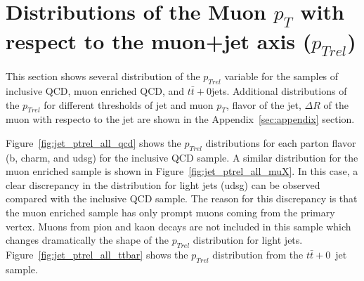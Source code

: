 \section{Distributions of the Muon $p_T$ with
respect to the muon+jet axis ($p_{Trel}$)}

This section shows several distribution of the $p_{Trel}$ variable
for the samples of inclusive QCD, muon enriched QCD, and $t\bar{t}+0$jets.
Additional distributions of the $p_{Trel}$ for different
thresholds of jet and muon $p_T$, flavor of the jet, $\Delta R$ of the
muon with respecto to the jet are shown in the Appendix~\ref{sec:appendix} section.

Figure~\ref{fig:jet_ptrel_all_qcd} shows the $p_{Trel}$ distributions
for each parton flavor (b, charm, and udsg) for the inclusive QCD sample.
A similar distribution for the muon enriched sample is shown in
Figure~\ref{fig:jet_ptrel_all_muX}. In this case, a clear discrepancy in 
the distribution for light jets (udsg) can be observed compared with
the inclusive QCD sample. The reason for this discrepancy is that
the muon enriched sample has only prompt muons coming from the primary
vertex. Muons from pion and kaon decays are not included in this
sample which changes dramatically the shape of the $p_{Trel}$ distribution
for light jets. Figure~\ref{fig:jet_ptrel_all_ttbar} shows the 
$p_{Trel}$ distribution from the $t\bar{t}+0$~jet sample.


